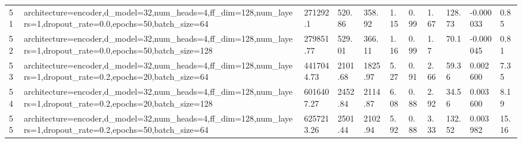\begin{longtable}{C{0.8cm} L{2cm} C{1.15cm} C{1.15cm} C{1.15cm} C{1.15cm} C{0.85cm} C{1.25cm} C{1.2cm} C{1.5cm} C{1.0cm}}
51 & architecture=encoder,\newline d\_model=32,\newline num\_heads=4,\newline ff\_dim=128,\newline num\_layers=1,\newline dropout\_rate=0.0,\newline epochs=50,\newline batch\_size=64 & 271292.1 & 520.86 & 358.92 & 1.15 & 0.99 & 1.67 & 128.73 & -0.000033 & 0.85 \\
52 & architecture=encoder,\newline d\_model=32,\newline num\_heads=4,\newline ff\_dim=128,\newline num\_layers=1,\newline dropout\_rate=0.0,\newline epochs=50,\newline batch\_size=128 & 279851.77 & 529.01 & 366.11 & 1.16 & 0.99 & 1.7 & 70.1 & -0.000045 & 0.81 \\
53 & architecture=encoder,\newline d\_model=32,\newline num\_heads=4,\newline ff\_dim=128,\newline num\_layers=1,\newline dropout\_rate=0.2,\newline epochs=20,\newline batch\_size=64 & 4417044.73 & 2101.68 & 1825.97 & 5.27 & 0.91 & 2.66 & 59.36 & 0.002600 & 7.35 \\
54 & architecture=encoder,\newline d\_model=32,\newline num\_heads=4,\newline ff\_dim=128,\newline num\_layers=1,\newline dropout\_rate=0.2,\newline epochs=20,\newline batch\_size=128 & 6016407.27 & 2452.84 & 2114.87 & 6.08 & 0.88 & 2.92 & 34.56 & 0.003600 & 8.19 \\
55 & architecture=encoder,\newline d\_model=32,\newline num\_heads=4,\newline ff\_dim=128,\newline num\_layers=1,\newline dropout\_rate=0.2,\newline epochs=50,\newline batch\_size=64 & 6257213.26 & 2501.44 & 2102.94 & 5.92 & 0.88 & 3.33 & 132.52 & 0.003982 & 15.16 \\

\end{longtable}

